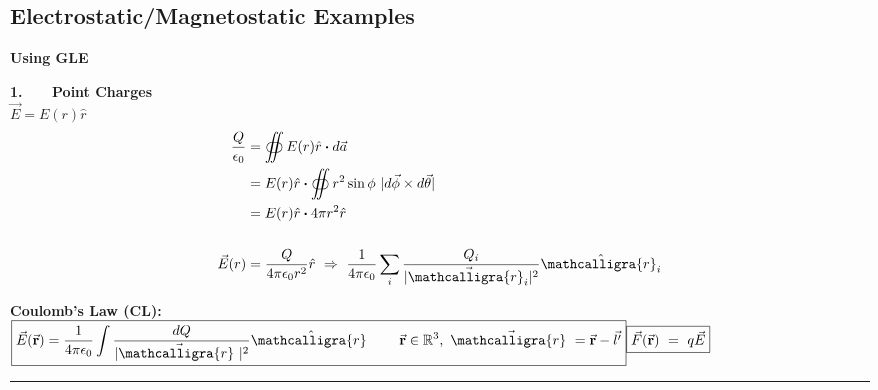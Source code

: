 \documentclass[12pt]{article}
\newcommand{\scripty}[1]{\ensuremath{\mathcalligra{#1}}}
\newcommand*{\cursr}{\scripty{r}}		%
\newcommand*{\cursrr}{\scripty{r}\ }
\newcommand*{\dotP}{\boldsymbol \cdot}		%
\begin{document}
\subsection{Electrostatic/Magnetostatic Examples}
\begin{minipage}[t]{0.5\textwidth}
	\textbf{Using GLE}
	
	\hfill \break
	\textbf{1. \ \ \ Point Charges}\\[10pt]
	\( \vec{E} = E(r)\hat{r} \)
	\begin{align*}
		\frac{Q}{\epsilon_0} &= \oiint E(r)\hat{r} \dotP d\vec{a}\\
		&= E(r)\hat{r} \dotP \oiint r^2 \sin{\phi} \ | d\vec{\phi} \times d\vec{\theta} |\\
		&= E(r)\hat{r} \dotP 4 \pi r^2 \hat{r}\\ \\
		\vec{E}(r) &= \frac{Q}{4 \pi \epsilon_0 r^2} \hat{r}
			\ \Rightarrow \ \dfrac{1}{4 \pi \epsilon_0} \sum_i \dfrac{Q_i}{ | \vec{ \cursr_i } |^2 } \hat{\cursr_i}
	\end{align*}

	\vspace{5pt}
	\textbf{Coulomb's Law (CL):}\\[10pt]
	\( \displaystyle 
		\boxed{  \vec{E}( \vec{ \mathbf{r} } )
			= \dfrac{1}{4 \pi \epsilon_0} \int \dfrac{dQ}{ | \vec{\cursrr} |^2 } \hat{\cursrr} 
			\ \ \ \ \ \ 
			\vec{ \mathbf{r} } \in \mathbb{R}^3, \ \vec{\cursrr} = \vec{ \mathbf{r} } - \vec{l'}
		} \\ \\ \\
		\boxed{
			\vec{F}( \vec{ \mathbf{r} } ) \ = \ q\vec{E} 
		}
	\)
\end{minipage}
\rule[-428pt]{.5pt}{440pt}
\hspace{0.01\textwidth}
\end{document}
